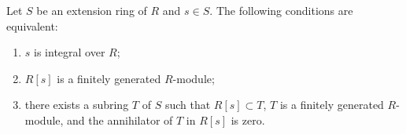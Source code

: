 Let $S$ be an extension ring of $R$ and $s \in S$. The following conditions are equivalent:
\begin{enumerate}
  \item $s$ is integral over $R$;
  \item $R[s]$ is a finitely generated $R$-module;
  \item there exists a subring $T$ of $S$ such that $R[s] \subset T$, $T$ is a finitely generated $R$-module, and the annihilator of $T$ in $R[s]$ is zero.
\end{enumerate}

